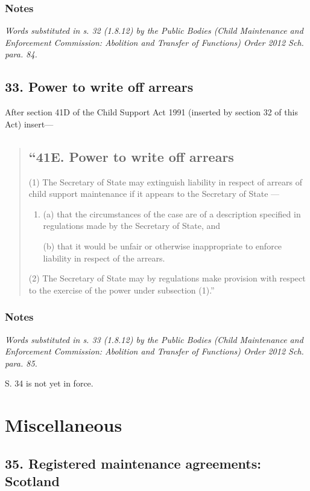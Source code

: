 \documentclass[a4paper]{article}
\newcommand\amendment[1]{\subsubsection*{Notes}{\itshape\frenchspacing\footnotesize #1 \par}}
\begin{document}
\amendment{
Words substituted in s. 32 (1.8.12) by the Public Bodies (Child Maintenance and Enforcement Commission: Abolition and Transfer of Functions) Order 2012 Sch. para. 84.
}

\subsection{33. Power to write off arrears}

After section 41D of the Child Support Act 1991 (inserted by section 32 of this Act) insert---

\begin{quotation}
\subsection*{``41E. Power to write off arrears}

(1) The 
Secretary of State %
may extinguish liability in respect of arrears of child support maintenance if it appears to 
the Secretary of State%
---
\begin{enumerate}\item[]
(a) that the circumstances of the case are of a description specified in regulations made by the Secretary of State, and

(b) that it would be unfair or otherwise inappropriate to enforce liability in
respect of the arrears.
\end{enumerate}

(2)
The Secretary of State may by regulations make provision with respect to the exercise of the power under subsection (1).''
\end{quotation}

\amendment{
Words substituted in s. 33 (1.8.12) by the Public Bodies (Child Maintenance and Enforcement Commission: Abolition and Transfer of Functions) Order 2012 Sch. para. 85.

\medskip

S. 34 is not yet in force.}

\section{Miscellaneous}

\subsection{35. Registered maintenance agreements: Scotland}
\end{document}
